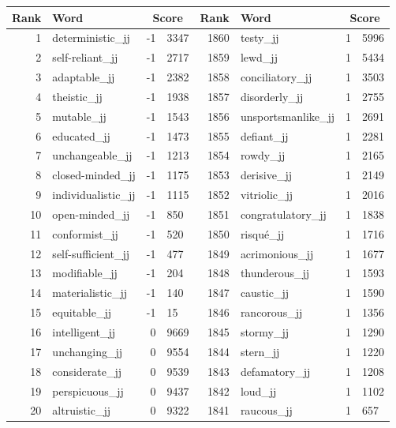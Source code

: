 \begin{table}[tbp]
    \begin{tabular}{| rlr@{.}l | rlr@{.}l |}
    \hline
    \textbf{Rank} & \textbf{Word} & \multicolumn{2}{c|}{\textbf{Score}} & \textbf{Rank} & \textbf{Word} & \multicolumn{2}{c|}{\textbf{Score}} \\
    \hline
    1 & deterministic\_jj & -1 & 3347    &    1860 & testy\_jj & 1 & 5996 \\
    2 & self-reliant\_jj & -1 & 2717    &    1859 & lewd\_jj & 1 & 5434 \\
    3 & adaptable\_jj & -1 & 2382    &    1858 & conciliatory\_jj & 1 & 3503 \\
    4 & theistic\_jj & -1 & 1938    &    1857 & disorderly\_jj & 1 & 2755 \\
    5 & mutable\_jj & -1 & 1543    &    1856 & unsportsmanlike\_jj & 1 & 2691 \\
    6 & educated\_jj & -1 & 1473    &    1855 & defiant\_jj & 1 & 2281 \\
    7 & unchangeable\_jj & -1 & 1213    &    1854 & rowdy\_jj & 1 & 2165 \\
    8 & closed-minded\_jj & -1 & 1175    &    1853 & derisive\_jj & 1 & 2149 \\
    9 & individualistic\_jj & -1 & 1115    &    1852 & vitriolic\_jj & 1 & 2016 \\
    10 & open-minded\_jj & -1 & 850    &    1851 & congratulatory\_jj & 1 & 1838 \\
    11 & conformist\_jj & -1 & 520    &    1850 & risqué\_jj & 1 & 1716 \\
    12 & self-sufficient\_jj & -1 & 477    &    1849 & acrimonious\_jj & 1 & 1677 \\
    13 & modifiable\_jj & -1 & 204    &    1848 & thunderous\_jj & 1 & 1593 \\
    14 & materialistic\_jj & -1 & 140    &    1847 & caustic\_jj & 1 & 1590 \\
    15 & equitable\_jj & -1 & 15    &    1846 & rancorous\_jj & 1 & 1356 \\
    16 & intelligent\_jj & 0 & 9669    &    1845 & stormy\_jj & 1 & 1290 \\
    17 & unchanging\_jj & 0 & 9554    &    1844 & stern\_jj & 1 & 1220 \\
    18 & considerate\_jj & 0 & 9539    &    1843 & defamatory\_jj & 1 & 1208 \\
    19 & perspicuous\_jj & 0 & 9437    &    1842 & loud\_jj & 1 & 1102 \\
    20 & altruistic\_jj & 0 & 9322    &    1841 & raucous\_jj & 1 & 657 \\

\end{tabular}
\end{table}
